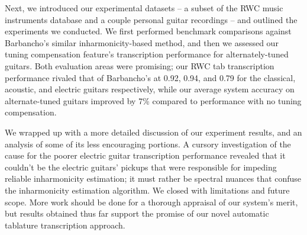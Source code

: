 \documentclass[12pt]{cmuthesis}
\begin{document}
Next, we introduced our experimental datasets -- a subset of the RWC music instruments database and a couple personal guitar recordings -- and outlined the experiments we conducted. We first performed benchmark comparisons against Barbancho's similar inharmonicity-based method, and then we assessed our tuning compensation feature's transcription performance for alternately-tuned guitars. Both evaluation areas were promising; our RWC tab transcription performance rivaled that of Barbancho's at 0.92, 0.94, and 0.79 for the classical, acoustic, and electric guitars respectively, while our average system accuracy on alternate-tuned guitars improved by 7\% compared to performance with no tuning compensation.

We wrapped up with a more detailed discussion of our experiment results, and an analysis of some of its less encouraging portions. A cursory investigation of the cause for the poorer electric guitar transcription performance revealed that it couldn't be the electric guitars' pickups that were responsible for impeding reliable inharmonicity estimation; it must rather be spectral nuances that confuse the inharmonicity estimation algorithm. We closed with limitations and future scope. More work should be done for a thorough appraisal of our system's merit, but results obtained thus far support the promise of our novel automatic tablature transcription approach.



\end{document}
